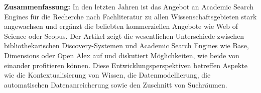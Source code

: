 \textbf{Zusammenfassung:} In den letzten Jahren ist das Angebot an
Academic Search Engines für die Recherche nach Fachliteratur zu allen
Wissenschaftsgebieten stark angewachsen und ergänzt die beliebten
kommerziellen Angebote wie Web of Science oder Scopus. Der Artikel zeigt
die wesentlichen Unterschiede zwischen bibliothekarischen
Discovery-Systemen und Academic Search Engines wie Base, Dimensions oder
Open Alex auf und diskutiert Möglichkeiten, wie beide von einander
profitieren können. Diese Entwicklungsperspektiven betreffen Aspekte wie
die Kontextualisierung von Wissen, die Datenmodellierung, die
automatischen Datenanreicherung sowie den Zuschnitt von Suchräumen.
